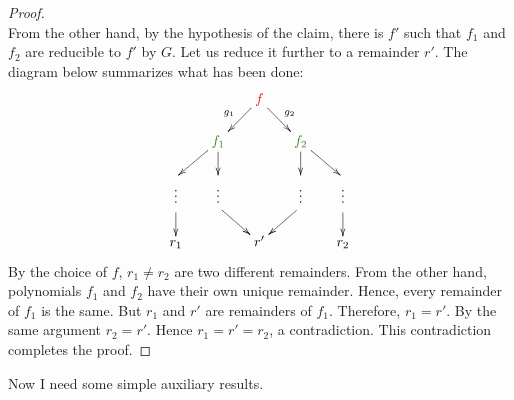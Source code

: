 \begin{proof}
\[\]
From the other hand, by the hypothesis of the claim, there is $f'$ such that $f_1$ and $f_2$ are reducible to $f'$ by $G$.
Let us reduce it further to a remainder $r'$.
The diagram below summarizes what has been done:
\[
\xymatrix@R=15pt@C=15pt{
	{}&{}&{\textcolor{red}{f}}\ar[dl]_{g_1}\ar[dr]^{g_2}&{}&{}\\
	{}&{\textcolor{OliveGreen}{f_1}}\ar[dl]\ar[d]&{}&{\textcolor{OliveGreen}{f_2}}\ar[d]\ar[dr]&{}\\
	{}\ar@{}[d]|{\vdots}&{}\ar@{}[d]|{\vdots}&{}&{}\ar@{}[d]|{\vdots}&{}\ar@{}[d]|{\vdots}\\
	{}\ar[d]&{}\ar[dr]&{}&{}\ar[dl]&{}\ar[d]\\
	{r_1}&{}&{r'}&{}&{r_2}\\
}
\]
By the choice of $f$, $r_1 \neq r_2$ are two different remainders.
From the other hand, polynomials $f_1$ and $f_2$ have their own unique remainder.
Hence, every remainder of $f_1$ is the same.
But $r_1$ and $r'$ are remainders of $f_1$.
Therefore, $r_1 = r'$.
By the same argument $r_2 = r'$.
Hence $r_1 = r' = r_2$, a contradiction.
This contradiction completes the proof.
\end{proof}

Now I need some simple auxiliary results.

